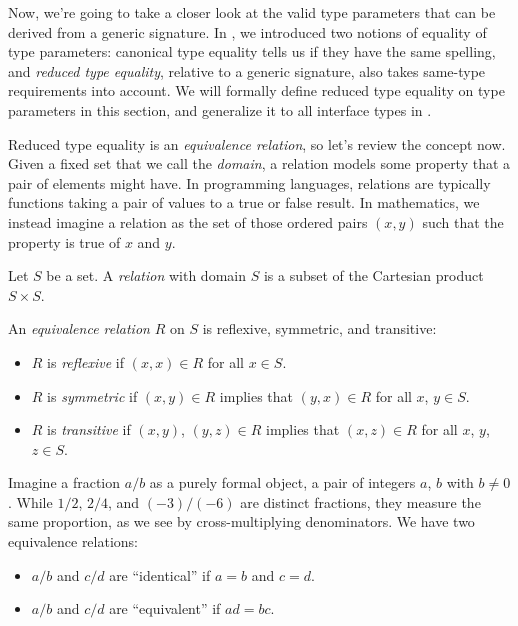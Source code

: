 \documentclass[../generics]{subfiles}
\begin{document}
Now, we're going to take a closer look at the valid type parameters that can be derived from a generic signature. In , we introduced two notions of equality of type parameters: canonical type equality tells us if they have the same spelling, and \emph{reduced type equality}, relative to a generic signature, also takes same-type requirements into account. We will formally define reduced type equality on type parameters in this section, and generalize it to all interface types in .

Reduced type equality is an \emph{equivalence relation}, so let's review the concept now. Given a fixed set that we call the \emph{domain}, a relation models some property that a pair of elements might have. In programming languages, relations are typically functions taking a pair of values to a true or false result. In mathematics, we instead imagine a relation as the set of those ordered pairs $(x,y)$ such that the property is true of $x$ and $y$.

\begin{definition}\label{def relation}
Let $S$ be a set. A \emph{relation} with domain $S$ is a subset of the Cartesian product $S\times S$.
\end{definition}

\begin{definition}
An \emph{equivalence relation} $R$ on $S$ is reflexive, symmetric, and transitive:
\begin{itemize}
\item $R$ is \emph{reflexive} if $(x,x)\in R$ for all $x\in S$.
\item $R$ is \emph{symmetric} if $(x,y)\in R$ implies that $(y,x)\in R$ for all $x$, $y\in S$.
\item $R$ is \emph{transitive} if $(x,y)$, $(y,z)\in R$ implies that $(x,z)\in R$ for all $x$, $y$, $z\in S$.
\end{itemize}
\end{definition}

Imagine a fraction $a/b$ as a purely formal object, a pair of integers $a$, $b$ with $b \neq 0$. While $1/2$, $2/4$, and $(-3)/(-6)$ are distinct fractions, they measure the same proportion, as we see by cross-multiplying denominators. We have two equivalence relations:
\begin{itemize}
\item $a/b$ and $c/d$ are ``identical'' if $a=b$ and $c=d$.
\item $a/b$ and $c/d$ are ``equivalent'' if $ad=bc$.
\end{itemize}
\end{document}

